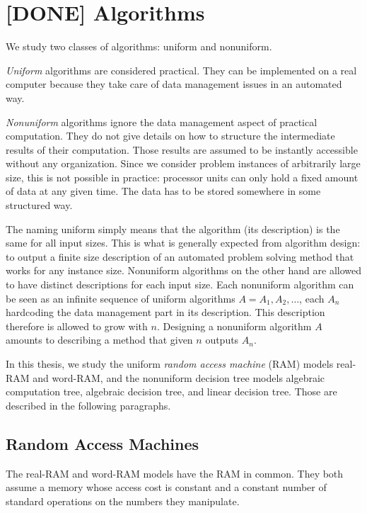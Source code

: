\section{[DONE] Algorithms}\label{sec:models-of-computation:algorithms}

We study two classes of algorithms: uniform and nonuniform.

\emph{Uniform} algorithms are considered practical. They can be implemented on
a real computer because they take care of data management issues in an
automated way.

\emph{Nonuniform} algorithms ignore the data management aspect of practical
computation. They do not give details on how to structure the intermediate
results of their computation. Those results are assumed to be instantly
accessible without any organization. Since we consider problem instances of
arbitrarily large size, this is not possible in practice:
processor units can only hold a fixed amount of data at any given time. The
data has to be stored somewhere in some structured way.

The naming uniform simply means that the algorithm (its description) is the
same for all input sizes. This is what is generally expected from algorithm
design: to output a finite size description of an automated problem solving
method that works for any instance size.
%
Nonuniform algorithms on the other hand are allowed to have distinct
descriptions for each input size. Each nonuniform algorithm can be seen as an
infinite sequence of uniform algorithms \(A = A_1, A_2, \ldots\), each \(A_n\)
hardcoding the data management part in its description. This description
therefore is allowed to grow with \(n\).
Designing a nonuniform algorithm \(A\) amounts to describing a method
that given \(n\) outputs \(A_n\).

In this thesis, we study the uniform \emph{random access machine} (RAM) models
real-RAM and word-RAM, and the nonuniform decision tree models algebraic
computation tree, algebraic decision tree, and linear decision tree. Those are
described in the following paragraphs.

\subsection{Random Access Machines}\label{sec:models-of-computation:algorithms:ram}

The real-RAM and word-RAM models have the RAM in common. They both assume
a memory whose access cost is constant and a constant number of standard
operations on the numbers they manipulate.

